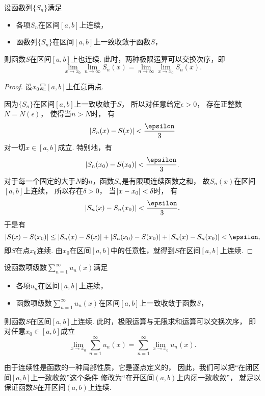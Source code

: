 \begin{theorem}\label{theorem:无穷级数.一致收敛级数的基本性质1}
设函数列\(\{S_n\}\)满足\begin{itemize}
	\item 各项\(S_n\)在区间\([a,b]\)上连续，
	\item 函数列\(\{S_n\}\)在区间\([a,b]\)上一致收敛于函数\(S\)，
\end{itemize}
则函数\(S\)在区间\([a,b]\)上也连续.
此时，两种极限运算可以交换次序，即\[
	\lim_{x \to x_0} \lim_{n\to\infty} S_n(x)
	= \lim_{n\to\infty} \lim_{x \to x_0} S_n(x).
\]
\begin{proof}
设\(x_0\)是\([a,b]\)上任意两点.

因为\(\{S_n\}\)在区间\([a,b]\)上一致收敛于\(S\)，
所以对任意给定\(\epsilon>0\)，
存在正整数\(N = N(\epsilon)\)，
使得当\(n>N\)时，
有\[
	\abs{S_n(x) - S(x)} < \frac\epsilon3
\]对一切\(x\in[a,b]\)成立.
特别地，有\[
	\abs{S_n(x_0) - S(x_0)} < \frac\epsilon3.
\]
对于每一个固定的大于\(N\)的\(n\)，函数\(S_n\)是有限项连续函数之和，
故\(S_n(x)\)在区间\([a,b]\)上连续，
所以存在\(\delta>0\)，
当\(\abs{x - x_0} < \delta\)时，
有\[
	\abs{S_n(x) - S_n(x_0)} < \frac\epsilon3.
\]
于是有\[
	\abs{S(x) - S(x_0)}
	\leq \abs{S_n(x) - S(x)}
		+ \abs{S_n(x_0) - S(x_0)}
		+ \abs{S_n(x) - S_n(x_0)}
	< \epsilon,
\]
即\(S\)在点\(x_0\)连续.
由\(x_0\)在区间\([a,b]\)中的任意性，就得到\(S\)在区间\([a,b]\)上连续.
\end{proof}
\end{theorem}
\begin{theorem}
设函数项级数\(\sum_{n=1}^\infty u_n(x)\)满足\begin{itemize}
	\item 各项\(u_n\)在区间\([a,b]\)上连续，
	\item 函数项级数\(\sum_{n=1}^\infty u_n(x)\)在区间\([a,b]\)上一致收敛于函数\(S\)，
\end{itemize}
则函数\(S\)在区间\([a,b]\)上连续.
此时，极限运算与无限求和运算可以交换次序，
即对任意\(x_0\in[a,b]\)成立\[
	\lim_{x \to x_0} \sum_{n=1}^\infty u_n(x)
	= \sum_{n=1}^\infty \lim_{x \to x_0} u_n(x).
\]
\end{theorem}
由于连续性是函数的一种局部性质，它是逐点定义的，
因此，我们可以把“在闭区间\([a,b]\)上一致收敛”这个条件
修改为“在开区间\((a,b)\)上内闭一致收敛”，
就足以保证函数\(S\)在开区间\((a,b)\)上连续.
